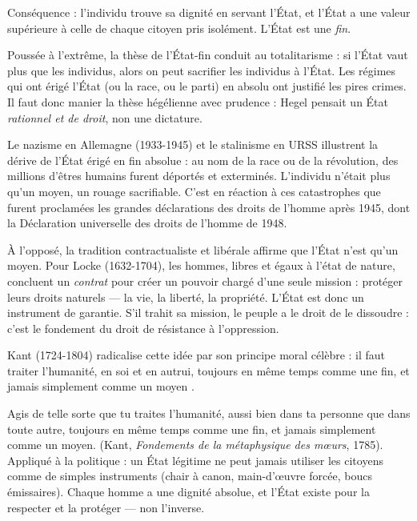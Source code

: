 \documentclass[11pt]{article}
\newcommand{\cle}[1]{{\popxbold\color{popdark}#1}}
\newcounter{popsec}
\newcounter{popsub}
\newcommand{\courssub}[1]{%
  \stepcounter{popsub}%
  \par\vspace{9pt}\noindent{\popxbold\fontsize{11.5}{13}\selectfont\color{popink}{\color{poporange}\thepopsec.\thepopsub}\hspace{6pt}#1}\par\nopagebreak\vspace{4pt}
}
\begin{document}
Conséquence : l'individu trouve sa dignité en servant l'État, et l'État a une valeur supérieure à celle de chaque citoyen pris isolément. L'État est une \emph{fin}.

\begin{attention}
Poussée à l'extrême, la thèse de l'État-fin conduit au \cle{totalitarisme} : si l'État vaut plus que les individus, alors on peut sacrifier les individus à l'État. Les régimes qui ont érigé l'État (ou la race, ou le parti) en absolu ont justifié les pires crimes. Il faut donc manier la thèse hégélienne avec prudence : Hegel pensait un État \emph{rationnel et de droit}, non une dictature.
\end{attention}

\begin{savaistu}
Le nazisme en Allemagne (1933-1945) et le stalinisme en URSS illustrent la dérive de l'État érigé en fin absolue : au nom de la race ou de la révolution, des millions d'êtres humains furent déportés et exterminés. L'individu n'était plus qu'un moyen, un rouage sacrifiable. C'est en réaction à ces catastrophes que furent proclamées les grandes déclarations des droits de l'homme après 1945, dont la Déclaration universelle des droits de l'homme de 1948.
\end{savaistu}

\courssub{Thèse 2 : l'État comme moyen (Locke, Kant)}

À l'opposé, la tradition \cle{contractualiste} et \cle{libérale} affirme que l'État n'est qu'un moyen. Pour \cle{Locke} (1632-1704), les hommes, libres et égaux à l'état de nature, concluent un \emph{contrat} pour créer un pouvoir chargé d'une seule mission : protéger leurs droits naturels — la vie, la liberté, la propriété. L'État est donc un instrument de garantie. S'il trahit sa mission, le peuple a le droit de le dissoudre : c'est le fondement du droit de résistance à l'oppression.

\cle{Kant} (1724-1804) radicalise cette idée par son principe moral célèbre : il faut traiter l'humanité, en soi et en autrui, \og toujours en même temps comme une fin, et jamais simplement comme un moyen \fg{}.

\begin{aretenir}
\og Agis de telle sorte que tu traites l'humanité, aussi bien dans ta personne que dans toute autre, toujours en même temps comme une fin, et jamais simplement comme un moyen. \fg{} (Kant, \emph{Fondements de la métaphysique des mœurs}, 1785). Appliqué à la politique : un État légitime ne peut jamais utiliser les citoyens comme de simples instruments (chair à canon, main-d'œuvre forcée, boucs émissaires). Chaque homme a une \cle{dignité} absolue, et l'État existe pour la respecter et la protéger — non l'inverse.
\end{aretenir}
\end{document}
